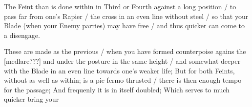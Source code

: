 The Feint than is done within in Third or Fourth against a long
position / to pass far from one's Rapier / the cross in an even line
without steel / so that your Blade (when your Enemy parries) may have
free / and thus quicker can come to a disengage.


These are made as the previous / when you have formed counterpoise
agains the [medlare???] and under the posture in the
same height / and somewhat deeper with the Blade in an even line
towards one's weaker life; But for both Feints,
without as well as within; is a pie fermo  thrusted / there is
then enough tempo for the passage; And frequenly it is in itself
doubled; Which serves to much quicker bring your
